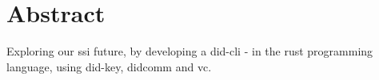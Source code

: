 \chapter*{Abstract}

Exploring our \acrfull{ssi} future, by developing a \acrfull{did-cli} - in the \gls{rust} programming language, using \gls{did-key}, \acrfull{didcomm} and \acrfull{vc}.
